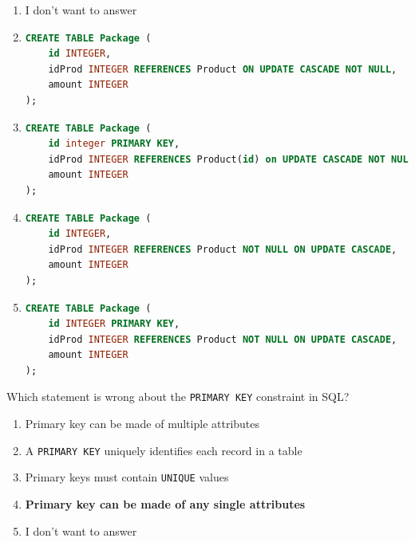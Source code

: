 \documentclass{bdad}
\begin{document}
\begin{enumerate}
    \item I don't want to answer

    \item 
\begin{lstlisting}[language=SQL, numbers=none, frame=none, belowskip=0pt]
CREATE TABLE Package (
    id INTEGER,
    idProd INTEGER REFERENCES Product ON UPDATE CASCADE NOT NULL,
    amount INTEGER
);
\end{lstlisting}

    \item 
\begin{lstlisting}[language=SQL, numbers=none, frame=none, belowskip=0pt]
CREATE TABLE Package (
    id integer PRIMARY KEY, 
    idProd INTEGER REFERENCES Product(id) on UPDATE CASCADE NOT NULL, 
    amount INTEGER
);
\end{lstlisting} \greencheckmark

    \item 
\begin{lstlisting}[language=SQL, numbers=none, frame=none, belowskip=0pt]
CREATE TABLE Package (
    id INTEGER, 
    idProd INTEGER REFERENCES Product NOT NULL ON UPDATE CASCADE, 
    amount INTEGER
);
\end{lstlisting}

    \item 
\begin{lstlisting}[language=SQL, numbers=none, frame=none, belowskip=0pt]
CREATE TABLE Package (
    id INTEGER PRIMARY KEY, 
    idProd INTEGER REFERENCES Product NOT NULL ON UPDATE CASCADE, 
    amount INTEGER
);
\end{lstlisting}
\end{enumerate}

Which statement is wrong about the \texttt{PRIMARY KEY} constraint in SQL?

\begin{enumerate}
    \item Primary key can be made of multiple attributes
    \item A \texttt{PRIMARY KEY} uniquely identifies each record in a table
    \item Primary keys must contain \texttt{UNIQUE} values
    \item \textbf{Primary key can be made of any single attributes \greencheckmark}
    \item I don't want to answer
\end{enumerate}
\end{document}
